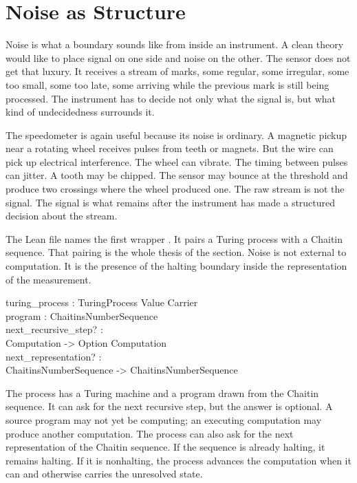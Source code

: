 \section{Noise as Structure}
\label{se:noise-as-structure}

Noise is what a boundary sounds like from inside an instrument. A clean theory
would like to place signal on one side and noise on the other. The sensor does
not get that luxury. It receives a stream of marks, some regular, some
irregular, some too small, some too late, some arriving while the previous mark
is still being processed. The instrument has to decide not only what the signal
is, but what kind of undecidedness surrounds it.

The speedometer is again useful because its noise is ordinary. A magnetic
pickup near a rotating wheel receives pulses from teeth or magnets. But the
wire can pick up electrical interference. The wheel can vibrate. The timing
between pulses can jitter. A tooth may be chipped. The sensor may bounce at the
threshold and produce two crossings where the wheel produced one. The raw
stream is not the signal. The signal is what remains after the instrument has
made a structured decision about the stream.

The Lean file names the first wrapper . It pairs a Turing
process with a Chaitin sequence. That pairing is the whole thesis of the
section. Noise is not external to computation. It is the presence of the
halting boundary inside the representation of the measurement.

\begin{leancode}
turing\_process : TuringProcess Value Carrier\\
program : ChaitinsNumberSequence\\
next\_recursive\_step? :\\
\quad Computation -> Option Computation\\
next\_representation? :\\
\quad ChaitinsNumberSequence -> ChaitinsNumberSequence
\end{leancode}

The process has a Turing machine and a program drawn from the Chaitin sequence.
It can ask for the next recursive step, but the answer is optional. A source
program may not yet be computing; an executing computation may produce another
computation. The process can also ask for the next representation of the
Chaitin sequence. If the sequence is already halting, it remains halting. If it
is nonhalting, the process advances the computation when it can and otherwise
carries the unresolved state.

